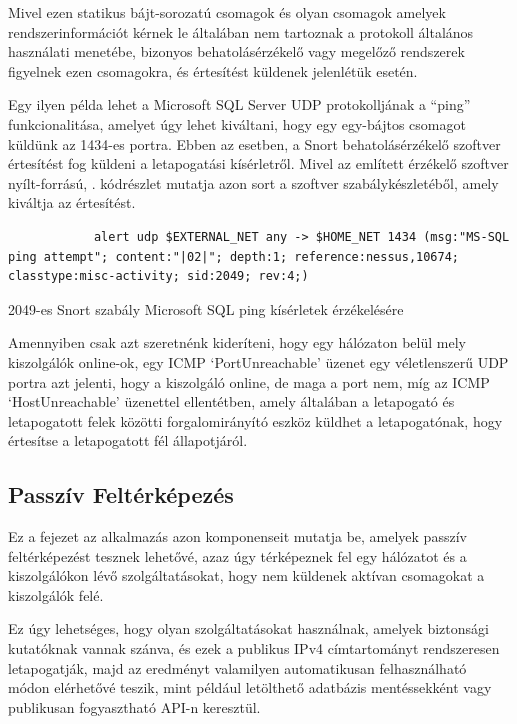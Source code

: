 \documentclass[a4paper,12pt]{article}
\begin{document}
	Mivel ezen statikus bájt-sorozatú csomagok és olyan csomagok amelyek rendszerinformációt kérnek le általában nem tartoznak a protokoll általános használati menetébe, bizonyos behatolásérzékelő vagy megelőző rendszerek figyelnek ezen csomagokra, és értesítést küldenek jelenlétük esetén.
	
	Egy ilyen példa lehet a Microsoft SQL Server UDP protokolljának a ``ping'' funkcionalitása, amelyet úgy lehet kiváltani, hogy egy egy-bájtos \texttt{} csomagot küldünk az 1434-es portra. Ebben az esetben, a Snort\cite{snort49} behatolásérzékelő szoftver értesítést fog küldeni a letapogatási kísérletről. Mivel az említett érzékelő szoftver nyílt-forrású, \az{\ref{snortrule}}. kódrészlet mutatja azon sort a szoftver szabálykészletéből, amely kiváltja az értesítést.
	
	\begin{listing}[H]
		\begin{verbatim}
			alert udp $EXTERNAL_NET any -> $HOME_NET 1434 (msg:"MS-SQL ping attempt"; content:"|02|"; depth:1; reference:nessus,10674; classtype:misc-activity; sid:2049; rev:4;)
		\end{verbatim}
		\caption{2049-es Snort szabály Microsoft SQL ping kísérletek érzékelésére\cite{snort49}}
		\label{snortrule}
	\end{listing}
	
	Amennyiben csak azt szeretnénk kideríteni, hogy egy hálózaton belül mely kiszolgálók online-ok, egy ICMP `PortUnreachable' üzenet egy véletlenszerű UDP portra azt jelenti, hogy a kiszolgáló online, de maga a port nem, míg az ICMP `HostUnreachable' üzenettel ellentétben, amely általában a letapogató és letapogatott felek közötti forgalomirányító eszköz küldhet a letapogatónak, hogy értesítse a letapogatott fél állapotjáról.

\subsection{Passzív Feltérképezés}

	Ez a fejezet az alkalmazás azon komponenseit mutatja be, amelyek passzív feltérképezést tesznek lehetővé, azaz úgy térképeznek fel egy hálózatot és a kiszolgálókon lévő szolgáltatásokat, hogy nem küldenek aktívan csomagokat a kiszolgálók felé.
	
	Ez úgy lehetséges, hogy olyan szolgáltatásokat használnak, amelyek biztonsági kutatóknak vannak szánva, és ezek a publikus IPv4 címtartományt rendszeresen letapogatják, majd az eredményt valamilyen automatikusan felhasználható módon elérhetővé teszik, mint például letölthető adatbázis mentéssekként vagy publikusan fogyasztható API-n keresztül.
\end{document}
